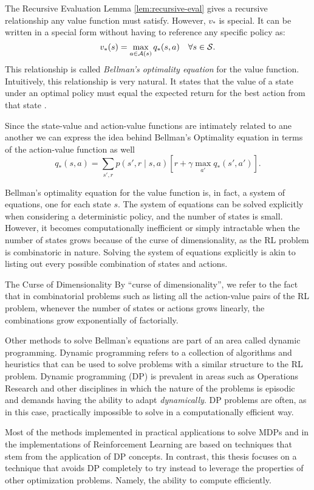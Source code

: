 The Recursive Evaluation Lemma \ref{lem:recursive-eval} gives a recursive
relationship any value function must satisfy. However, $v_*$ is special. It can
be written in a special form \cite{bellman1957,SuttonBarto,raoRL4F} without
having to reference any specific policy as:
\begin{equation}
	\label{eq:prop-dependencia-vq}
	v_* (s) = \max_{a \in \mathcal{A}(s)} q_* (s, a) \quad \forall s \in \mathcal{S}.
\end{equation}
This relationship is called \textit{Bellman's optimality equation} for the value
function. Intuitively, this relationship is very natural. It states that the
value of a state under an optimal policy must equal the expected return for the
best action from that state \cite[Ch.~3.6]{SuttonBarto}.

Since the state-value and action-value functions are intimately related to ane
another we can express the idea behind Bellman's Optimality equation in terms of
the action-value function as well
\[
	q_* (s, a) = \sum_{s', r} p(s', r \mid s, a) \left[ r + \gamma \max_{a'} q_{*} (s', a') \right].
\]

Bellman's optimality equation for the value function is, in fact, a system of
equations, one for each state $s$. The system of equations can be solved
explicitly when considering a deterministic policy, and the number of states is
small. However, it becomes computationally inefficient or simply intractable
when the number of states grows because of the curse of dimensionality, as the
RL problem is combinatoric in nature. Solving the system of equations explicitly
is akin to listing out every possible combination of states and actions.

\begin{remark}{The Curse of Dimensionality}
	By ``curse of dimensionality'', we refer to the fact that in combinatorial
	problems such as listing all the action-value pairs of the RL problem,
	whenever the number of states or actions grows linearly, the combinations
	grow exponentially of factorially.
\end{remark}

Other methods to solve Bellman's equations are part of an area called dynamic
programming. Dynamic programming refers to a collection of algorithms and
heuristics that can be used to solve problems with a similar structure to the RL
problem. Dynamic programming (DP) is prevalent in areas such as Operations
Research and other disciplines in which the nature of the problems is episodic
and demands having the ability to adapt \textit{dynamically}. DP problems are
often, as in this case, practically impossible to solve in a computationally
efficient way.

Most of the methods implemented in practical applications to solve MDPs and in
the implementations of Reinforcement Learning are based on techniques that stem
from the application of DP concepts. In contrast, this thesis focuses on a
technique that avoids DP completely to try instead to leverage the properties of
other optimization problems. Namely, the ability to compute efficiently.